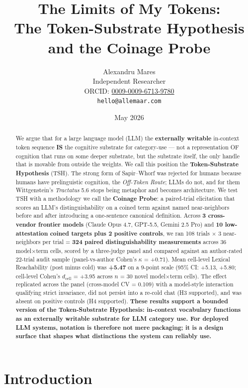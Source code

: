 \documentclass[11pt,a4paper]{article}
\title{The Limits of My Tokens:\\ The Token-Substrate Hypothesis and the Coinage Probe}
\author{
  Alexandru Mares \\
  Independent Researcher \\
  ORCID: \href{https://orcid.org/0009-0009-6713-9780}{0009-0009-6713-9780} \\
  \texttt{hello@allemaar.com}
}
\date{May 2026}
\begin{document}
\maketitle

\begin{abstract}
We argue that for a large language model (LLM) the \textbf{externally writable} in-context token sequence \textbf{IS} the cognitive substrate for category-use --- not a representation OF cognition that runs on some deeper substrate, but the substrate itself, the only handle that is movable from outside the weights. We call this position the \textbf{Token-Substrate Hypothesis} (TSH). The strong form of Sapir--Whorf was rejected for humans because humans have prelinguistic cognition, the \textit{Off-Token Route}; LLMs do not, and for them Wittgenstein's \textit{Tractatus} 5.6 stops being metaphor and becomes architecture. We test TSH with a methodology we call the \textbf{Coinage Probe}: a paired-trial elicitation that scores an LLM's distinguishability on a coined term against named near-neighbors before and after introducing a one-sentence canonical definition. Across \textbf{3 cross-vendor frontier models} (Claude Opus 4.7, GPT-5.5, Gemini 2.5 Pro) and \textbf{10 low-attestation coined targets plus 2 positive controls}, we ran 108 trials $\times$ 3 near-neighbors per trial = \textbf{324 paired distinguishability measurements} across 36 model$\times$term cells, scored by a three-judge panel and compared against an author-rated 22-trial audit sample (panel-vs-author Cohen's $\kappa$ = +0.71). Mean cell-level Lexical Reachability (post minus cold) was \textbf{+5.47} on a 9-point scale (95\% CI: +5.13, +5.80; cell-level Cohen's $d_{\text{cell}}$ = +3.95 across $n$ = 30 novel model$\times$term cells). The effect replicated across the panel (cross-model CV = 0.109) with a model-style interaction qualifying strict invariance, did not persist into a re-cold chat (H3 supported), and was absent on positive controls (H4 supported). \textbf{These results support a bounded version of the Token-Substrate Hypothesis: in-context vocabulary functions as an externally writable substrate for LLM category use. For deployed LLM systems, notation is therefore not mere packaging; it is a design surface that shapes what distinctions the system can reliably use.}
\end{abstract}

\section{Introduction}
\end{document}
